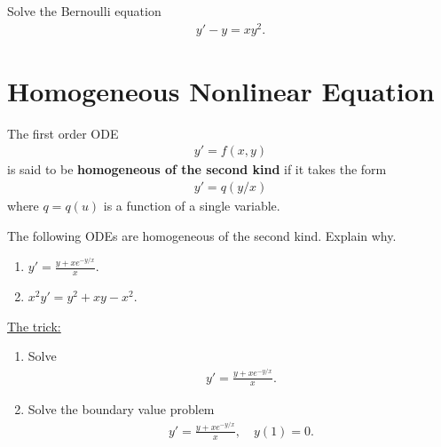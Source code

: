 \documentclass[12pt,a4paper]{article}
\newcounter{example}[section]
\begin{document}
\newpage

\begin{example}
Solve the Bernoulli equation
	\begin{align*}
	y' - y = xy^2 .
	\end{align*}
\end{example}

\newpage

\section{Homogeneous Nonlinear Equation}
The first order ODE 
	\begin{align*}
	y' = f(x, y)
	\end{align*}
is said to be \textbf{homogeneous of the second kind} if it takes the form
	\begin{align*}
	y' = q(y/x)
	\end{align*}
where $q = q(u)$ is a function of a single variable.

\vspace*{16pt}

\begin{example}
The following ODEs are homogeneous of the second kind. Explain why.
	\begin{enumerate}
	\item $\displaystyle y' = \frac{y + xe^{-y/x}}{x}$.
	\item $\displaystyle x^2 y' = y^2 + xy - x^2$.
	\end{enumerate}
\end{example}
	
\vspace*{24pt}

\underline{The trick:}

\newpage

\begin{example}
\begin{enumerate}
\item Solve
	\begin{align*}
	y' = \frac{y + xe^{-y/x}}{x} .
	\end{align*}
\item Solve the boundary value problem
	\begin{align*}
	y' = \frac{y + xe^{-y/x}}{x}, \quad y(1) = 0 .
	\end{align*}
\end{enumerate}
\end{example}
\end{document}

